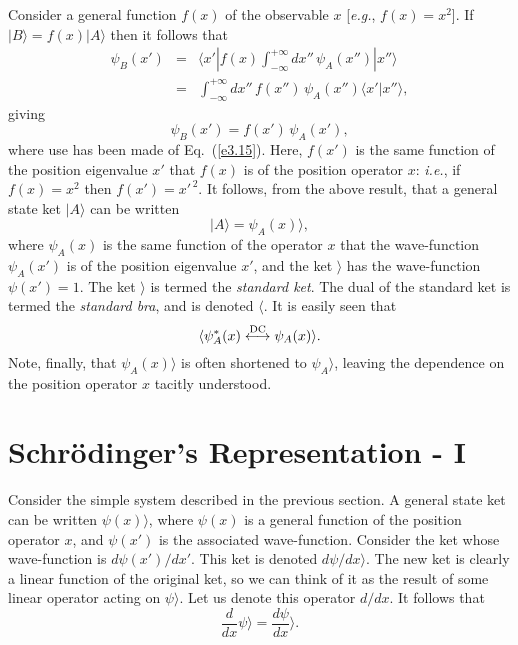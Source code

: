 Consider a general function $f(x)$ of the observable $x$ [{\em e.g.}, $f(x)=x^2$]. 
If $|B\rangle = f(x)|A\rangle$ then it follows that
\begin{eqnarray}
\psi_B(x')& = &\langle x'| f(x) \int_{-\infty}^{+\infty} dx''\,\psi_A(x'')|x''\rangle
\nonumber\\[0.5ex]
&=& \int_{-\infty}^{+\infty} dx''\, f(x'')\,\psi_A(x'') \langle x'|x''\rangle,
\end{eqnarray}
giving
\begin{equation}
\psi_B(x') = f(x')\, \psi_A(x'),
\end{equation}
where use has been made of Eq.~(\ref{e3.15}). Here, $f(x')$ is the same function
of the position eigenvalue $x'$ that $f(x)$ is of the position operator $x$:
{\em i.e.}, if $f(x)=x^2$ then $f(x') = x'^{\,2}$. It follows, from the above result,
that a general state ket $|A \rangle$ can be written
\begin{equation}
|A\rangle = \psi_A(x) \rangle,
\end{equation}
where $\psi_A(x)$ is the same function of the operator $x$ that the wave-function
$\psi_A(x')$ is of the position eigenvalue $x'$, and the ket $\rangle$ has the
wave-function $\psi(x') =1$. The ket $\rangle$ is termed the {\em standard ket}. 
The dual of the standard ket is termed the {\em standard bra}, and is
denoted $\langle$.  It is
easily seen that
\begin{equation}\label{e3.25}
\langle \psi_A^\ast(x) \stackrel{\rm DC}{\longleftrightarrow} \psi_A(x)\rangle.
\end{equation}
Note, finally, that $\psi_A(x)\rangle$ is often shortened to $\psi_A\rangle$, leaving
the dependence on the position operator $x$ tacitly understood. 

\section{Schr\"{o}dinger's Representation - I}\label{s3.4}
Consider the simple system described in the previous section. A general
state ket can be written $\psi(x)\rangle$, where $\psi(x)$ is a general function of
the position operator $x$, and $\psi(x')$ is the associated wave-function. 
Consider the ket whose wave-function is $d\psi(x')/dx'$. This ket is
denoted $d\psi/dx\rangle$. The new ket is clearly a linear function of
the  original ket, so we can think of it as the result of some linear
operator acting on $\psi\rangle$. Let us denote this operator
$d/dx$. It follows that
\begin{equation}
\frac{d}{dx} \psi\rangle = \frac{d\psi}{dx}\rangle.
\end{equation}

